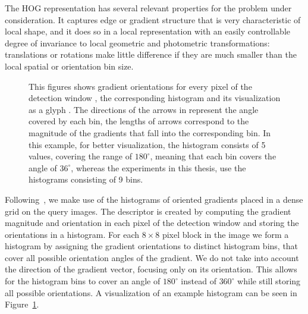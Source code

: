 The HOG representation has several relevant properties for the problem under
consideration. It captures edge or gradient structure that is very
characteristic of local shape, and it does so in a local representation with
an easily controllable degree of invariance to local geometric and photometric
transformations: translations or rotations make little difference if they are
much smaller than the local spatial or orientation bin size.

\begin{figure}[th]
\centering
{} \hspace{3mm}
 \hspace{3mm}
\caption{This figures shows gradient orientations for every pixel of the detection window , the corresponding histogram  and its visualization as a glyph . The directions of the arrows in  represent the angle covered by each bin, the lengths of arrows correspond to the magnitude of the gradients that fall into the corresponding bin. In this example, for better visualization, the histogram consists of 5 values, covering the range of $180^\circ$, meaning that each bin covers the angle of $36^\circ$, whereas the experiments in this thesis, use the histograms consisting of 9 bins.}
\label{fig:hog_simple}
\end{figure}

Following~\citet{dalal2005}, we make use of the histograms of oriented
gradients placed in a dense grid on the query images. The descriptor is
created by computing the gradient magnitude and orientation in each pixel of
the detection window and storing the orientations in a histogram. For each $8
\times 8$ pixel block in the image we form a histogram by assigning the
gradient orientations to distinct histogram bins, that cover all possible
orientation angles of the gradient. We do not take into account the direction
of the gradient vector, focusing only on its orientation. This allows for the
histogram bins to cover an angle of $180^{\circ}$ instead of $360^{\circ}$
while still storing all possible orientations. A visualization of an example
histogram can be seen in Figure~\ref{fig:hog_simple}.

